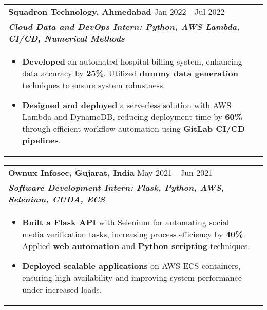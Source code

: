 \documentclass[a4paper,10pt]{article}
\begin{document}
\begin{tabularx}{\linewidth}{@{}l r@{}}
\textbf{Squadron Technology, Ahmedabad} \hfill \color[HTML]{371e77} Jan 2022 - Jul 2022 \\[1pt]
\color[HTML]{371e77}\textbf{\textit{Cloud Data and DevOps Intern: Python, AWS Lambda, CI/CD, Numerical Methods}} \\[1pt]
\begin{minipage}[t]{\linewidth}
\begin{itemize}[nosep, after=\strut, leftmargin=2em, itemsep=2pt]
    \item \textbf{Developed} an automated hospital billing system, enhancing data accuracy by \textbf{25\%}. Utilized \textbf{dummy data generation} techniques to ensure system robustness.
    \item \textbf{Designed and deployed} a serverless solution with AWS Lambda and DynamoDB, reducing deployment time by \textbf{60\%} through efficient workflow automation using \textbf{GitLab CI/CD pipelines}.
\end{itemize}
\end{minipage}
\end{tabularx}

\begin{tabularx}{\linewidth}{@{}l r@{}}
\textbf{Ownux Infosec, Gujarat, India} \hfill \color[HTML]{371e77} May 2021 - Jun 2021 \\[1pt]
\color[HTML]{371e77}\textbf{\textit{Software Development Intern: Flask, Python, AWS, Selenium, CUDA, ECS}} \\[1pt]
\begin{minipage}[t]{\linewidth}
\begin{itemize}[nosep, after=\strut, leftmargin=2em, itemsep=2pt]
    \item \textbf{Built a Flask API} with Selenium for automating social media verification tasks, increasing process efficiency by \textbf{40\%}. Applied \textbf{web automation} and \textbf{Python scripting} techniques.
    \item \textbf{Deployed scalable applications} on AWS ECS containers, ensuring high availability and improving system performance under increased loads.
\end{itemize}
\end{minipage}
\end{tabularx}
\end{document}
